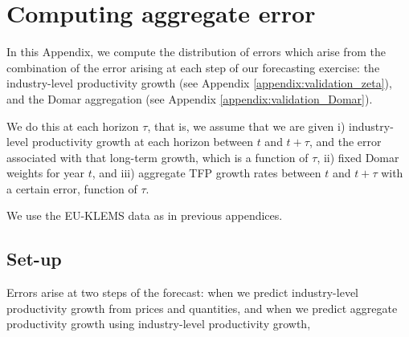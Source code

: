 \documentclass[11pt]{article}
\begin{document}
\section{Computing aggregate error}
\label{appendix:cross_error_aggregate}

In this Appendix, we compute the distribution of errors which arise from the combination of the error arising at each step of our forecasting exercise: the industry-level productivity growth (see Appendix \ref{appendix:validation_zeta}), and the Domar aggregation (see Appendix \ref{appendix:validation_Domar}).

We do this at each horizon $\tau$, that is, we assume that we are given i) industry-level productivity growth at each horizon between $t$ and $t+\tau$, and the error associated with that long-term growth, which is a function of $\tau$, ii) fixed Domar weights for year $t$, and iii) aggregate TFP growth rates between $t$ and $t+\tau$ with a certain error, function of $\tau$.

We use the EU-KLEMS data \citep{bontadiniEUKLEMSINTANProdIndustry2023} as in previous appendices.

\subsection{Set-up}


Errors arise at two steps of the forecast: when we predict industry-level productivity growth from prices and quantities, and when we predict aggregate productivity growth using industry-level productivity growth,
\end{document}
